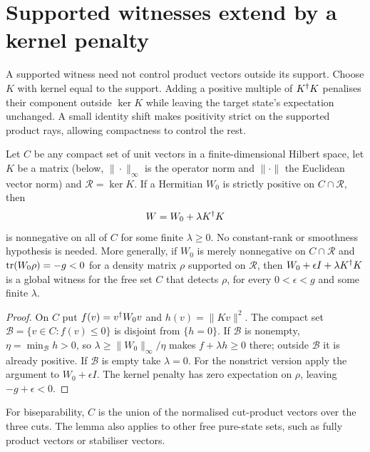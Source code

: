 \section{Supported witnesses extend by a kernel penalty}\label{sec:ppt3-kernel}

A supported witness need not control product vectors outside its support. Choose $K$ with kernel equal to the support.
Adding a positive multiple of $K^{\dagger} K$ penalises their component outside $\ker K$ while leaving the target state's expectation unchanged. A small identity shift makes
positivity strict on the supported product rays, allowing compactness to control the rest.

\begin{lemma}\label{lem:ppt3-kernel-penalty}
Let $C$ be any compact set of unit vectors in a finite-dimensional Hilbert space, let $K$ be a matrix (below, $\|\cdot\|_\infty$ is the operator norm and $\|\cdot\|$ the Euclidean vector norm) and
$\mathcal R=\ker K$. If a Hermitian $W_0$ is strictly positive on $C\cap\mathcal R$, then
\[
W=W_0+\lambda K^{\dagger} K
\]
is nonnegative on all of $C$ for some finite $\lambda\ge0$. No constant-rank or smoothness hypothesis is needed. More
generally, if $W_0$ is merely nonnegative on $C\cap\mathcal R$ and $\operatorname{tr}(W_0\rho)=-g<0$ for a density matrix $\rho$ supported
on $\mathcal R$, then $W_0+\epsilon I+\lambda K^{\dagger} K$ is a global witness for the free set $C$ that detects $\rho$, for every
$0<\epsilon<g$ and some finite $\lambda$.
\end{lemma}
\begin{proof}
On $C$ put $f(v)=v^{\dagger} W_0v$ and $h(v)=\|Kv\|^2$. The compact set $\mathcal B=\{v\in C:f(v)\le0\}$ is disjoint from
$\{h=0\}$. If $\mathcal B$ is nonempty, $\eta=\min_{\mathcal B}h>0$, so $\lambda\ge\|W_0\|_\infty/\eta$ makes $f+\lambda h\ge0$ there;
outside $\mathcal B$ it is already positive. If $\mathcal B$ is empty take $\lambda=0$. For the nonstrict version apply
the argument to $W_0+\epsilon I$. The kernel penalty has zero expectation on $\rho$, leaving $-g+\epsilon<0$.
\end{proof}

For biseparability, $C$ is the union of the normalised cut-product vectors over the three cuts.
The lemma also applies to other free pure-state sets, such as fully product vectors or stabiliser vectors.

